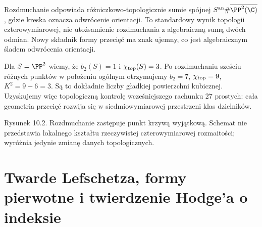 \begin{uwaga}
Rozdmuchanie odpowiada różniczkowo-topologicznie sumie
spójnej $S^{\rm an}\#\overline{\PP^2(\C)}$,
gdzie kreska oznacza odwrócenie orientacji.
To standardowy wynik topologii czterowymiarowej,
nie utożsamienie rozdmuchania z algebraiczną sumą dwóch
odmian. Nowy składnik formy przecięć ma znak ujemny,
co jest algebraicznym śladem odwrócenia orientacji.
\end{uwaga}

\begin{przyklad}
Dla $S=\PP^2$ wiemy, że $b_2(S)=1$ i
$\chi_{\rm top}(S)=3$. Po rozdmuchaniu sześciu
różnych punktów w położeniu ogólnym otrzymujemy
$b_2=7$, $\chi_{\rm top}=9$, $K^2=9-6=3$.
Są to dokładnie liczby gładkiej powierzchni kubicznej.
Uzyskujemy więc topologiczną kontrolę wcześniejszego
rachunku 27 prostych: cała geometria przecięć rozwija się
w siedmiowymiarowej przestrzeni klas dzielników.
\end{przyklad}

\begin{center}

{\small Rysunek 10.2. Rozdmuchanie zastępuje punkt krzywą wyjątkową.
Schemat nie przedstawia lokalnego kształtu rzeczywistej czterowymiarowej
rozmaitości; wyróżnia jedynie zmianę danych topologicznych.}\par
\end{center}

\section{Twarde Lefschetza, formy pierwotne i twierdzenie Hodge'a o indeksie}
\label{sec:ga10-hard-index}

